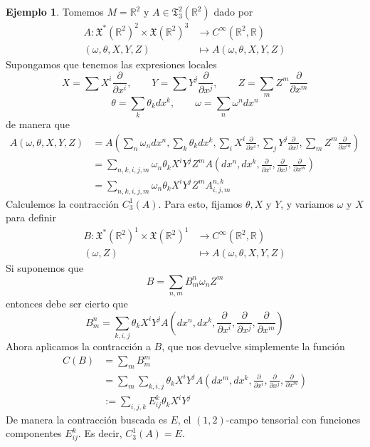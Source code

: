 \documentclass[spanish]{book}
\theoremstyle{definition}
\newtheorem*{ejem}{Ejemplo}
\newcommand{\R}{\mathbb{R}}
\newcommand{\T}{\mathfrak{T}}
\newcommand{\Cinf}{C^\infty}
\begin{document}
	\begin{ejem}
		Tomemos $M=\R^2$ y $A\in\T^2_3(\R^2)$ dado por
		\begin{align*}
			A:\mathfrak{X}^*(\R^2)^2\times\mathfrak{X}(\R^2)^3&\to\Cinf(\R^2,\R)\\
			(\omega,\theta,X,Y,Z)&\mapsto A(\omega,\theta,X,Y,Z)
		\end{align*}
		Supongamos que tenemos las expresiones locales
		\[X=\sum X^i\frac{\partial}{\partial x^i},\qquad Y=\sum Y^j\frac{\partial}{\partial x^j},\qquad Z=\sum_mZ^m\frac{\partial}{\partial x^m}\]\[ \theta=\sum_k\theta_k dx^k,\qquad \omega=\sum_n\omega^ndx^n\]
		de manera que
		\begin{align*}
			A(\omega,\theta,X,Y,Z)&=A\left(\sum_n\omega_ndx^n,\sum_k\theta_k dx^k,\sum_iX^i\frac{\partial}{\partial x^i},\sum_jY^j\frac{\partial}{\partial x^j},\sum_mZ^m\frac{\partial}{\partial x^m}\right)\\
			&=\sum_{n,k,i,j,m}\omega_n\theta_kX^iY^jZ^mA\left(dx^n,dx^k,\frac{\partial}{\partial x^i},\frac{\partial}{\partial x^j},\frac{\partial}{\partial x^m}\right)\\
			&=\sum_{n,k,i,j,m}\omega_n\theta_kX^iY^jZ^mA^{n,k}_{i,j,m}
		\end{align*}
		Calculemos la contracción $C^1_3(A)$. Para esto, fijamos $\theta,X$ y $Y$, y variamos $\omega$ y $X$ para definir
		\begin{align*}
			B:\mathfrak{X}^*(\R^2)^1\times\mathfrak{X}(\R^2)^1&\to\Cinf(\R^2,\R)\\
			(\omega,Z)&\mapsto A(\omega,\theta,X,Y,Z)
		\end{align*}
		Si suponemos que
		\[B=\sum_{n,m} B^n_m\omega_nZ^m\]
		entonces debe ser cierto que
		\[B^n_m=\sum_{k,i,j}\theta_kX^iY^jA\left(dx^n,dx^k,\frac{\partial}{\partial x^i},\frac{\partial}{\partial x^j},\frac{\partial}{\partial x^m}\right)\]
		Ahora aplicamos la contracción a $B$, que nos devuelve simplemente la función
		\begin{align*}C(B)&=\sum_mB^m_m\\
			&=\sum_m\sum_{k,i,j}\theta_kX^iY^jA\left(dx^m,dx^k,\frac{\partial}{\partial x^i},\frac{\partial}{\partial x^j},\frac{\partial}{\partial x^m}\right)\\
			&:=\sum_{i,j,k}E^k_{ij}\theta_kX^iY^j
		\end{align*}
		De manera la contracción buscada es $E$, el $(1,2)$-campo tensorial con funciones componentes $E^k_{ij}$. Es decir, $C^1_3(A)=E$.
	\end{ejem}
	
\end{document}

